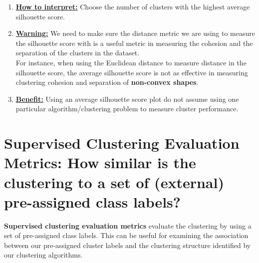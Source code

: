 \documentclass[11pt]{elegantbook}
\begin{document}
\begin{enumerate}[(1).]
    \item \textbf{\underline{How to interpret:}} Choose the number of clusters with the highest average silhouette score.
    \item \textbf{\underline{Warning:}} We need to make sure the distance metric we are using to measure the silhouette score with is a useful metric in measuring the cohesion and the separation of
    the clusters in the dataset.\\
    For instance, when using the Euclidean distance to measure distance in the silhouette score, the average silhouette score is not as effective in measuring clustering cohesion and separation of \textbf{non-convex shapes}.
    \item \textbf{\underline{Benefit:}} Using an average silhouette score plot do not assume using one particular algorithm/clustering problem to measure cluster performance.
\end{enumerate}




\section{Supervised Clustering Evaluation Metrics: How similar is the clustering to a set of (external) pre-assigned class labels?}

\begin{definition}
    \textbf{Supervised clustering evaluation metrics} evaluate the clustering by using a set of pre-assigned class labels. This can be useful for examining the association between our pre-assigned cluster labels and the clustering structure identified by our clustering algorithms.
\end{definition}
\end{document}
